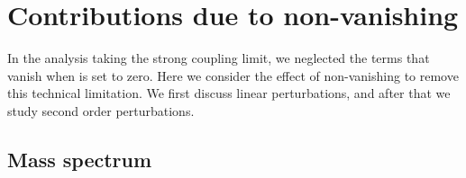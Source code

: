\documentclass[a4paper,showpacs,preprintnumbers,amsmath,amssymb]{revtex4}
\begin{document}
 
\section{Contributions due to non-vanishing \myHighlight{$\lambda_\pm$}\coordHE{}}
\label{sec:finite coupling}

In the analysis taking the strong coupling limit, we neglected the terms that vanish when \myHighlight{$\lambda_\pm$}\coordHE{} is set to zero. 
Here we consider the effect of non-vanishing \myHighlight{$\lambda_\pm$}\coordHE{} to remove this technical limitation. 
We first discuss linear perturbations, and after that we study second order perturbations. 


\subsection{Mass spectrum}
\end{document}
